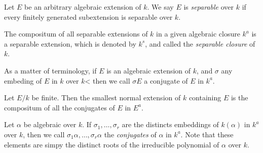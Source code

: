 \begin{definition}
    Let $E$ be an arbitrary algebraic extension of $k$. We say $E$ is \textit{separable} over $k$ if every finitely generated subextension is separable over $k$.
\end{definition}

\begin{definition}
    The compositum of all separable extensions of $k$ in a given algebraic closure $k^a$ is a separable extension, which is denoted by $k^s$, and called the \textit{separable closure} of $k$.

    As a matter of terminology, if $E$ is an algebraic extension of $k$, and $\sigma$ any embeding of $E$ in $k$ over $k$< then we call $\sigma E$ a conjugate of $E$ in $k^a$.
\end{definition}

\begin{corollary}
    Let $E/k$ be finite. Then the smallest normal extension of $k$ containing $E$ is the compositum of all the conjugates of $E$ in $E^a$.
\end{corollary}

\begin{definition}
    Let $\alpha$ be algebraic over $k$. If $\sigma_1,\ldots,\sigma_r$ are the distincts embeddings of $k(\alpha)$ in $k^a$ over $k$, then we call $\sigma_1\alpha,\ldots,\sigma_r\alpha$ the \textit{conjugates} of $\alpha$ in $k^a$. Note that these elements are simpy the distinct roots of the irreducible polynomial of $\alpha$ over $k$.
\end{definition}

